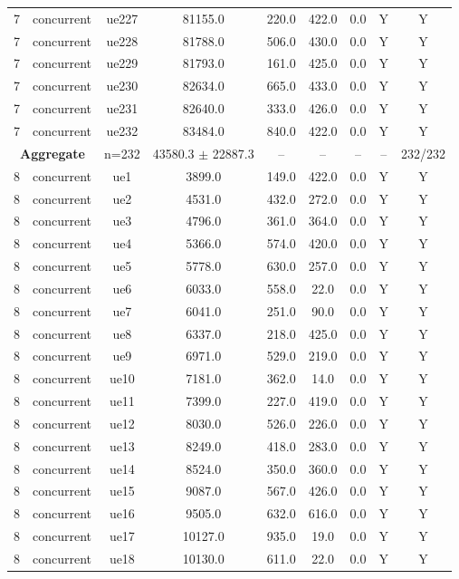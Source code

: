 \begin{table}[ht]
\begin{tabular}{|c|c|c|c|c|c|c|c|c|}
7 & concurrent & ue227 & 81155.0 & 220.0 & 422.0 & 0.0 & Y & Y \\
7 & concurrent & ue228 & 81788.0 & 506.0 & 430.0 & 0.0 & Y & Y \\
7 & concurrent & ue229 & 81793.0 & 161.0 & 425.0 & 0.0 & Y & Y \\
7 & concurrent & ue230 & 82634.0 & 665.0 & 433.0 & 0.0 & Y & Y \\
7 & concurrent & ue231 & 82640.0 & 333.0 & 426.0 & 0.0 & Y & Y \\
7 & concurrent & ue232 & 83484.0 & 840.0 & 422.0 & 0.0 & Y & Y \\
\multicolumn{2}{|c|}{\textbf{Aggregate}} & n=232 & 43580.3 $\pm$ 22887.3 & -- & -- & -- & -- & 232/232 \\
\hline
8 & concurrent & ue1 & 3899.0 & 149.0 & 422.0 & 0.0 & Y & Y \\
8 & concurrent & ue2 & 4531.0 & 432.0 & 272.0 & 0.0 & Y & Y \\
8 & concurrent & ue3 & 4796.0 & 361.0 & 364.0 & 0.0 & Y & Y \\
8 & concurrent & ue4 & 5366.0 & 574.0 & 420.0 & 0.0 & Y & Y \\
8 & concurrent & ue5 & 5778.0 & 630.0 & 257.0 & 0.0 & Y & Y \\
8 & concurrent & ue6 & 6033.0 & 558.0 & 22.0 & 0.0 & Y & Y \\
8 & concurrent & ue7 & 6041.0 & 251.0 & 90.0 & 0.0 & Y & Y \\
8 & concurrent & ue8 & 6337.0 & 218.0 & 425.0 & 0.0 & Y & Y \\
8 & concurrent & ue9 & 6971.0 & 529.0 & 219.0 & 0.0 & Y & Y \\
8 & concurrent & ue10 & 7181.0 & 362.0 & 14.0 & 0.0 & Y & Y \\
8 & concurrent & ue11 & 7399.0 & 227.0 & 419.0 & 0.0 & Y & Y \\
8 & concurrent & ue12 & 8030.0 & 526.0 & 226.0 & 0.0 & Y & Y \\
8 & concurrent & ue13 & 8249.0 & 418.0 & 283.0 & 0.0 & Y & Y \\
8 & concurrent & ue14 & 8524.0 & 350.0 & 360.0 & 0.0 & Y & Y \\
8 & concurrent & ue15 & 9087.0 & 567.0 & 426.0 & 0.0 & Y & Y \\
8 & concurrent & ue16 & 9505.0 & 632.0 & 616.0 & 0.0 & Y & Y \\
8 & concurrent & ue17 & 10127.0 & 935.0 & 19.0 & 0.0 & Y & Y \\
8 & concurrent & ue18 & 10130.0 & 611.0 & 22.0 & 0.0 & Y & Y \\

\end{tabular}
\end{table}
